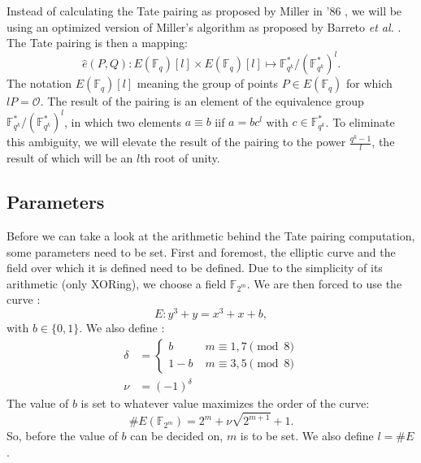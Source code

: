 Instead of calculating the Tate pairing as proposed by Miller in '86 \cite{miller}, we will be using an optimized version of Miller's algorithm as proposed by Barreto \emph{et al.} \cite{barreto-efficient}. The Tate pairing is then a mapping:
\begin{displaymath}
\hat{e}(P, Q) : E(\mathbb{F}_q) [l] \times E(\mathbb{F}_q) [l] \mapsto \mathbb{F}_{q^k}^*/(\mathbb{F}_{q^k}^*)^l.
\end{displaymath}
The notation $E(\mathbb{F}_q) [l]$ meaning the group of points $P \in E(\mathbb{F}_q)$ for which $l P = \mathcal{O}$. The result of the pairing is an element of the equivalence group $\mathbb{F}_{q^k}^*/(\mathbb{F}_{q^k}^*)^l$, in which two elements $a \equiv b$ iif $a = bc^l$ with $c \in \mathbb{F}_{q^k}^*$. To eliminate this ambiguity, we will elevate the result of the pairing to the power $\frac{q^k - 1}{l}$, the result of which will be an $l$th root of unity.

\subsection{Parameters}

Before we can take a look at the arithmetic behind the Tate pairing computation, some parameters need to be set. First and foremost, the elliptic curve and the field over which it is defined need to be defined. Due to the simplicity of its arithmetic (only XORing), we choose a field $\mathbb{F}_{2^m}$. We are then forced to use the curve \cite{barreto-efficient}:
\begin{displaymath}
E : y^3 + y = x^3 + x + b,
\end{displaymath}
with $b \in \{0,1\}$. We also define \cite{beuchat}:
\begin{displaymath}\begin{aligned}
\delta	&= \begin{cases}
				b		\qquad &m \equiv 1, 7 \pmod 8\\
				1 - b			&m \equiv 3, 5	\pmod 8
				\end{cases}\\
\nu		&= (-1)^{\delta}
\end{aligned}\end{displaymath}
The value of $b$ is set to whatever value maximizes the order of the curve:
\begin{displaymath}
\#E(\mathbb{F}_{2^m}) = 2^m + \nu \sqrt{2^{m+1}} + 1.
\end{displaymath}
So, before the value of $b$ can be decided on, $m$ is to be set. We also define $l = \#E$.

